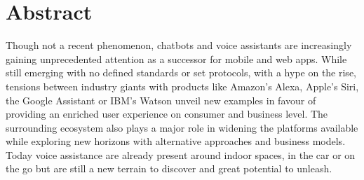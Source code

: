 %
%
%


\newpage
\chapter*{Abstract}

Though not a recent phenomenon, chatbots and voice assistants are increasingly gaining unprecedented attention as a successor for mobile and web apps. While still emerging with no defined standards or set protocols, with a hype on the rise, tensions between industry giants with products like Amazon's Alexa, Apple's Siri, the Google Assistant or IBM's Watson unveil new examples in favour of providing an enriched user experience on consumer and business level. The surrounding ecosystem also plays a major role in widening the platforms available while exploring new horizons with alternative approaches and business models. Today voice assistance are already present around indoor spaces, in the car or on the go but are still a new terrain to discover and great potential to unleash. 

